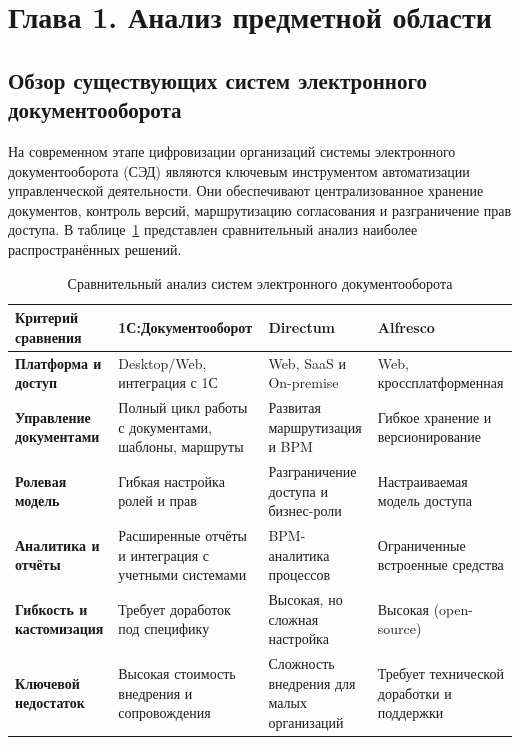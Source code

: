\section*{Глава 1. Анализ предметной области}

\subsection{Обзор существующих систем электронного документооборота}

На современном этапе цифровизации организаций системы электронного документооборота (СЭД) являются ключевым инструментом автоматизации управленческой деятельности. Они обеспечивают централизованное хранение документов, контроль версий, маршрутизацию согласования и разграничение прав доступа. В таблице~\ref{tab:competitors} представлен сравнительный анализ наиболее распространённых решений.

\begin{table}[ht!]
\centering
\caption{Сравнительный анализ систем электронного документооборота}
\label{tab:competitors}
\setlength{\tabcolsep}{3pt}
\small
\renewcommand{\arraystretch}{1.15}
\begin{tabularx}{\textwidth}{|p{3cm}|*{3}{>{\raggedright\arraybackslash}X|}}
\hline
\textbf{Критерий сравнения} & \textbf{1С:Документооборот} & \textbf{Directum} & \textbf{Alfresco} \\ \hline
\textbf{Платформа и доступ} & Desktop/Web, интеграция с 1С & Web, SaaS и On-premise & Web, кроссплатформенная \\ \hline
\textbf{Управление документами} & Полный цикл работы с документами, шаблоны, маршруты & Развитая маршрутизация и BPM & Гибкое хранение и версионирование \\ \hline
\textbf{Ролевая модель} & Гибкая настройка ролей и прав & Разграничение доступа и бизнес-роли & Настраиваемая модель доступа \\ \hline
\textbf{Аналитика и отчёты} & Расширенные отчёты и интеграция с учетными системами & BPM-аналитика процессов & Ограниченные встроенные средства \\ \hline
\textbf{Гибкость и кастомизация} & Требует доработок под специфику & Высокая, но сложная настройка & Высокая (open-source) \\ \hline
\textbf{Ключевой недостаток} & Высокая стоимость внедрения и сопровождения & Сложность внедрения для малых организаций & Требует технической доработки и поддержки \\ \hline
\end{tabularx}
\end{table}

